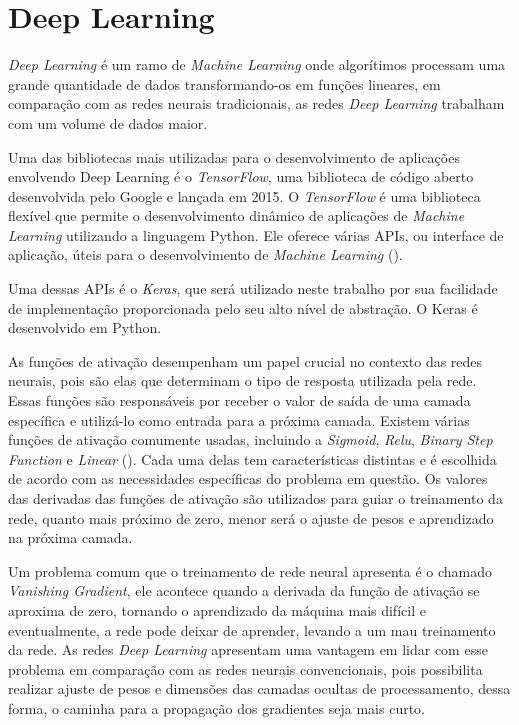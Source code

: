 \section{Deep Learning}

\textit{Deep Learning} é um ramo de \textit{Machine Learning} onde algorítimos processam uma grande quantidade de dados transformando-os em funções lineares, em comparação com as redes neurais tradicionais, as redes \textit{Deep Learning} trabalham com um volume de dados maior. 

Uma das bibliotecas mais utilizadas para o desenvolvimento de aplicações envolvendo Deep Learning é o \textit{TensorFlow}, uma biblioteca de código aberto desenvolvida pelo Google e lançada em 2015. O \textit{TensorFlow} é uma biblioteca flexível que permite o desenvolvimento dinâmico de aplicações de \textit{Machine Learning} utilizando a linguagem Python. Ele oferece várias APIs, ou interface de aplicação, úteis para o desenvolvimento de \textit{Machine Learning} (\cite{pang2020deep}).

Uma dessas APIs é o \textit{Keras}, que será utilizado neste trabalho por sua facilidade de implementação proporcionada pelo seu alto nível de abstração. O Keras é desenvolvido em Python.

\par As funções de ativação desempenham um papel crucial no contexto das redes neurais, pois são elas que determinam o tipo de resposta utilizada pela rede. Essas funções são responsáveis por receber o valor de saída de uma camada específica e utilizá-lo como entrada para a próxima camada. Existem várias funções de ativação comumente usadas, incluindo a \textit{Sigmoid}, \textit{Relu}, \textit{Binary Step Function} e \textit{Linear} (\cite{Sharma2020}). Cada uma delas tem características distintas e é escolhida de acordo com as necessidades específicas do problema em questão. Os valores das derivadas das funções de ativação são utilizados para guiar o treinamento da rede, quanto mais próximo de zero, menor será o ajuste de pesos e aprendizado na próxima camada. 

\par Um problema comum que o treinamento de rede neural apresenta é o chamado \textit{Vanishing Gradient}, ele acontece quando a derivada da função de ativação se aproxima de zero, tornando o aprendizado da máquina mais difícil e eventualmente, a rede pode deixar de aprender, levando a um mau treinamento da rede. As redes \textit{Deep Learning} apresentam uma vantagem em lidar com esse problema em comparação com as redes neurais convencionais, pois possibilita realizar ajuste de pesos e dimensões das camadas ocultas de processamento, dessa forma, o caminha para a propagação dos gradientes seja mais curto.
